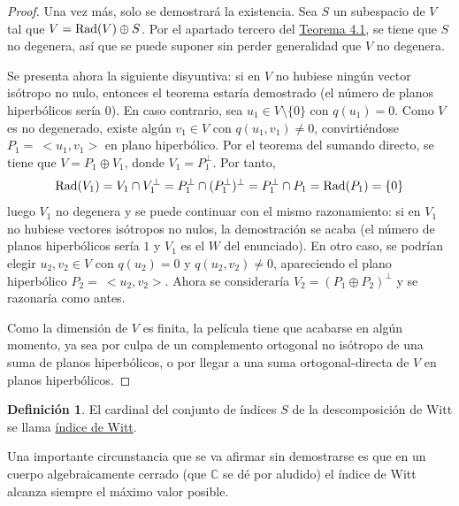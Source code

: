 \documentclass[12pt]{report}
\theoremstyle{definition}
\newtheorem{definition}{Definición}[chapter]
\theoremstyle{definition}
\theoremstyle{remark}
\begin{document}
\begin{proof}
Una vez más, solo se demostrará la existencia. Sea $S$ un subespacio de $V$ tal que $ V = \textup{Rad}(V) \oplus S$. Por el apartado tercero del \hyperref[teo4.1.]{\color{blue}Teorema 4.1}, se tiene que $S$ no degenera, así que se puede suponer sin perder generalidad que $V$ no degenera.

\vspace{2mm}
Se presenta ahora la siguiente disyuntiva: si en $V$ no hubiese ningún vector isótropo no nulo, entonces el teorema estaría demostrado (el número de planos hiperbólicos sería $0$). En caso contrario, sea $u_1 \in V \setminus \{0\}$ con $q(u_1) = 0$. Como $V$ es no degenerado, existe algún $v_1 \in V$ con $q(u_1,v_1) \neq 0$, convirtiéndose $P_1 = \ <u_1,v_1>$ en plano hiperbólico. Por el teorema del sumando directo, se tiene que $V = P_1 \oplus V_1$, donde $V_1 = P_1^\perp$. Por tanto,
\[\textup{Rad}(V_1) = V_1 \cap V_1^\perp = P_1^\perp \cap (P_1^\perp)^\perp = P_1^\perp \cap P_1 = \textup{Rad}(P_1)=\{0\}\]
luego $V_1$ no degenera y se puede continuar con el mismo razonamiento: si en $V_1$ no hubiese vectores isótropos no nulos, la demostración se acaba (el número de planos hiperbólicos sería $1$ y $V_1$ es el $W$ del enunciado). En otro caso, se podrían elegir $u_2,v_2 \in V$ con $q(u_2) = 0$ y $q(u_2,v_2) \neq 0$, apareciendo el plano hiperbólico $P_2 = \ <u_2,v_2>$. Ahora se consideraría $V_2 = (P_1 \oplus P_2)^\perp$ y se razonaría como antes. 

\vspace{2mm}
Como la dimensión de $V$ es finita, la película tiene que acabarse en algún momento, ya sea por culpa de un complemento ortogonal no isótropo de una suma de planos hiperbólicos, o por llegar a una suma ortogonal-directa de $V$ en planos hiperbólicos.
\end{proof}

\begin{definition}
El cardinal del conjunto de índices $S$ de la descomposición de Witt se llama \ul{índice de Witt}.
\end{definition}

Una importante circunstancia que se va afirmar sin demostrarse es que en un cuerpo algebraicamente cerrado (que $\mathbb{C}$ se dé por aludido) el índice de Witt alcanza siempre el máximo valor posible.
\end{document}
